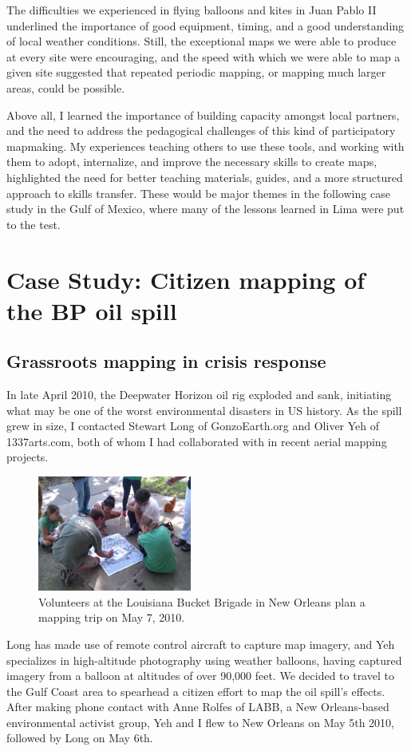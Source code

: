 \documentclass[11pt,oneside,notitlepage]{report}
\begin{document}
The difficulties we experienced in flying balloons and kites in Juan Pablo II underlined the importance of good equipment, timing, and a good understanding of local weather conditions. Still, the exceptional maps we were able to produce at every site were encouraging, and the speed with which we were able to map a given site suggested that repeated periodic mapping, or mapping much larger areas, could be possible. 

Above all, I learned the importance of building capacity amongst local partners, and the need to address the pedagogical challenges of this kind of participatory mapmaking. My experiences teaching others to use these tools, and working with them to adopt, internalize, and improve the necessary skills to create maps, highlighted the need for better teaching materials, guides, and a more structured approach to skills transfer. These would be major themes in the following case study in the Gulf of Mexico, where many of the lessons learned in Lima were put to the test. 

\chapter{Case Study: Citizen mapping of the BP oil spill}
\label{chap:gulf}

\section{Grassroots mapping in crisis response}

In late April 2010, the Deepwater Horizon oil rig exploded and sank, initiating what may be one of the worst environmental disasters in US history. \cite{campbell2010oil} As the spill grew in size, I contacted Stewart Long of GonzoEarth.org and Oliver Yeh of 1337arts.com, both of whom I had collaborated with in recent aerial mapping projects. \begin{figure}
	\begin{flushright}
		\includegraphics[width=0.45\textwidth]{images/labb-planning.jpg}
		\caption{Volunteers at the Louisiana Bucket Brigade in New Orleans plan a mapping trip on May 7, 2010.}
	\end{flushright}
\end{figure}Long has made use of remote control aircraft to capture map imagery, and Yeh specializes in high-altitude photography using weather balloons, having captured imagery from a balloon at altitudes of over 90,000 feet. We decided to travel to the Gulf Coast area to spearhead a citizen effort to map the oil spill's effects. After making phone contact with Anne Rolfes of \ac{LABB}, a New Orleans-based environmental activist group, Yeh and I flew to New Orleans on May 5th 2010, followed by Long on May 6th. 
\end{document}
